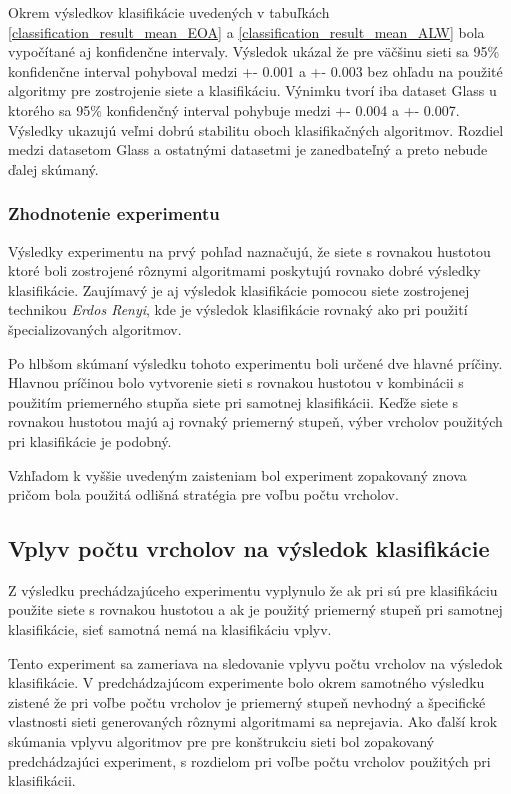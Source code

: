 \documentclass[slovak,master,dept460,male,cpp,cpdeclaration]{diploma}
\begin{document}
Okrem výsledkov klasifikácie uvedených v tabuľkách \ref{classification_result_mean_EOA} a \ref{classification_result_mean_ALW} bola vypočítané aj konfidenčne intervaly. Výsledok ukázal že pre väčšinu sieti sa 95\% konfidenčne interval pohyboval medzi +- 0.001 a +- 0.003 bez ohľadu na použité algoritmy pre zostrojenie siete a klasifikáciu. Výnimku tvorí iba dataset Glass u ktorého sa 95\% konfidenčný interval pohybuje medzi +- 0.004 a +- 0.007. Výsledky ukazujú veľmi dobrú stabilitu oboch klasifikačných algoritmov. Rozdiel medzi datasetom Glass a ostatnými datasetmi je zanedbateľný a preto nebude ďalej skúmaný.

\subsubsection{Zhodnotenie experimentu}
Výsledky experimentu na prvý pohľad naznačujú, že siete s rovnakou hustotou ktoré boli zostrojené rôznymi algoritmami poskytujú rovnako dobré výsledky klasifikácie. Zaujímavý je aj výsledok klasifikácie pomocou siete zostrojenej technikou \textit{Erdos Renyi}, kde je výsledok klasifikácie rovnaký ako pri použití špecializovaných algoritmov.

Po hlbšom skúmaní výsledku tohoto experimentu boli určené dve hlavné príčiny. Hlavnou príčinou bolo vytvorenie sieti  s rovnakou hustotou v kombinácii s použitím priemerného stupňa siete pri samotnej klasifikácii. Keďže siete s  rovnakou hustotou majú aj rovnaký priemerný stupeň, výber vrcholov použitých pri klasifikácie je podobný.

Vzhľadom k vyššie uvedeným zaisteniam bol experiment zopakovaný znova pričom bola použitá odlišná stratégia pre voľbu počtu vrcholov.

\subsection{Vplyv počtu vrcholov na výsledok klasifikácie}
Z výsledku prechádzajúceho experimentu vyplynulo že ak pri sú pre klasifikáciu použite siete s rovnakou hustotou a ak je použitý priemerný stupeň pri samotnej klasifikácie, sieť samotná nemá na klasifikáciu vplyv.

Tento experiment sa zameriava na sledovanie vplyvu počtu vrcholov na výsledok klasifikácie. V predchádzajúcom experimente bolo okrem samotného výsledku zistené že pri voľbe počtu vrcholov je priemerný stupeň nevhodný a špecifické vlastnosti sieti generovaných rôznymi algoritmami sa neprejavia. Ako ďalší krok skúmania vplyvu algoritmov pre pre konštrukciu sieti bol zopakovaný predchádzajúci experiment, s rozdielom pri voľbe počtu vrcholov použitých pri klasifikácii.
\end{document}
